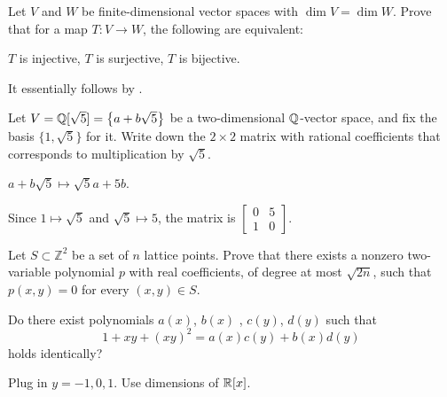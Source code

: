 \begin{dproblem}
	\label{prob:equal_dimension}
	Let $V$ and $W$ be finite-dimensional vector
	spaces with $\dim V = \dim W$.
	Prove that for a map $T \colon V \to W$,
	the following are equivalent:
	\begin{itemize}
		\ii $T$ is injective,
		\ii $T$ is surjective,
		\ii $T$ is bijective.
	\end{itemize}
	\begin{sol}
		It essentially follows by .
	\end{sol}
\end{dproblem}

\begin{problem}
	Let $V = \mathbb Q[\sqrt5] = \left\{ a + b \sqrt 5 \right\}$
	be a two-dimensional $\mathbb Q$-vector space,
	and fix the basis $\{1, \sqrt 5\}$ for it.
	Write down the $2 \times 2$ matrix with rational coefficients
	that corresponds to multiplication by $\sqrt 5$.
	\begin{hint}
		$a + b \sqrt 5 \mapsto \sqrt 5 a + 5b$.
	\end{hint}
	\begin{sol}
		Since $1 \mapsto \sqrt5$ and $\sqrt5 \mapsto 5$,
		the matrix is
		$\begin{bmatrix}
			0 & 5 \\
			1 & 0
		\end{bmatrix}$.
	\end{sol}
\end{problem}

\begin{problem}
	Let $S \subset {\mathbb Z}^2$ be a set of $n$ lattice points.
	Prove that there exists a nonzero two-variable polynomial $p$
	with real coefficients, of degree at most $\sqrt{2n}$,
	such that $p(x,y) = 0$ for every $(x,y) \in S$.
\end{problem}

\begin{problem}
	[Putnam 2003]
	Do there exist polynomials $a(x)$, $b(x)$ , $c(y)$, $d(y)$ such that
	\[ 1 + xy + (xy)^2 = a(x)c(y) + b(x)d(y) \]
	holds identically?
	\begin{hint}
		Plug in $y = -1, 0, 1$. Use dimensions of $\mathbb R[x]$.
	\end{hint}
\end{problem}

